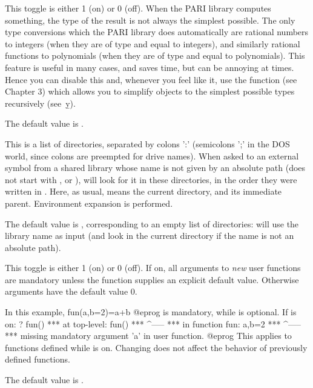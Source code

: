 {\label{se:def,simplify}
This toggle is either 1 (on) or 0 (off). When the PARI library computes
something, the type of the
result is not always the simplest possible. The only type conversions which
the PARI library does automatically are rational numbers to integers (when
they are of type  and equal to integers), and similarly rational
functions to polynomials (when they are of type  and equal to
polynomials). This feature is useful in many cases, and saves time, but can
be annoying at times. Hence you can disable this and, whenever you feel like
it, use the function  (see Chapter 3) which allows you to
simplify objects to the simplest possible types recursively (see~\b{y}).

The default value is .

\label{se:def,sopath}
This is a list of directories, separated by colons ':'
(semicolons ';' in the DOS world, since colons are preempted for drive names).
When asked to  an external symbol from a shared library whose
name is not given by an absolute path (does not start with \kbd{/}, 
or ),  will look for it in these directories, in the order
they were written in . Here, as usual,  means the current
directory, and  its immediate parent. Environment expansion is
performed.

The default value is , corresponding to an empty list of
directories:  will use the library name as input (and look in
the current directory if the name is not an absolute path).

\label{se:def,strictargs}
This toggle is either 1 (on) or 0 (off). If on, all arguments to \emph{new}
user functions are mandatory unless the function supplies an explicit default
value.
Otherwise arguments have the default value $0$.

In this example,
\bprog
  fun(a,b=2)=a+b
@eprog
 is mandatory, while  is optional. If  is on:
\bprog
? fun()
 ***   at top-level: fun()
 ***                 ^-----
 ***   in function fun: a,b=2
 ***                    ^-----
 ***   missing mandatory argument 'a' in user function.
@eprog
This applies to functions defined while  is on. Changing 
does not affect the behavior of previously defined functions.

The default value is .

}
